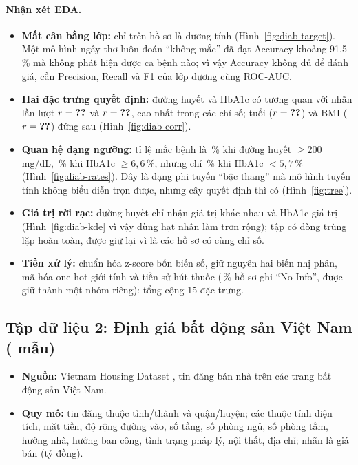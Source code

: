 \paragraph{Nhận xét EDA.}
\begin{itemize}
  \item \textbf{Mất cân bằng lớp:} chỉ  trên  hồ sơ là dương tính
    (Hình~\ref{fig:diab-target}). Một mô hình ngây thơ luôn đoán “không mắc” đã đạt Accuracy khoảng 91,5\,\% mà không phát
    hiện được ca bệnh nào; vì vậy Accuracy không đủ để đánh giá, cần Precision, Recall và F1 của lớp dương cùng ROC-AUC.
  \item \textbf{Hai đặc trưng quyết định:} đường huyết và HbA1c có tương quan với nhãn lần lượt
    $r = \SL{eda/diabetes/corr_glucose}$ và $r = \SL{eda/diabetes/corr_hba1c}$, cao nhất trong các chỉ số; tuổi
    ($r = \SL{eda/diabetes/corr_age}$) và BMI ($r = \SL{eda/diabetes/corr_bmi}$) đứng sau (Hình~\ref{fig:diab-corr}).
  \item \textbf{Quan hệ dạng ngưỡng:} tỉ lệ mắc bệnh là \,\% khi đường huyết
    $\ge 200$\,mg/dL, \,\% khi HbA1c $\ge 6{,}6$\,\%, nhưng chỉ
    \,\% khi HbA1c $< 5{,}7$\,\% (Hình~\ref{fig:diab-rates}). Đây là dạng phi tuyến “bậc
    thang” mà mô hình tuyến tính không biểu diễn trọn được, nhưng cây quyết định thì có (Hình~\ref{fig:tree}).
  \item \textbf{Giá trị rời rạc:} đường huyết chỉ nhận  giá trị khác nhau và HbA1c
     giá trị (Hình~\ref{fig:diab-kde} vì vậy dùng hạt nhân làm trơn rộng); tập có
     dòng trùng lặp hoàn toàn, được giữ lại vì là các hồ sơ có cùng chỉ số.
  \item \textbf{Tiền xử lý:} chuẩn hóa z-score bốn biến số, giữ nguyên hai biến nhị phân, mã hóa one-hot giới tính và tiền
    sử hút thuốc (\,\% hồ sơ ghi “No Info”, được giữ thành một nhóm riêng): tổng cộng
    15 đặc trưng.
\end{itemize}

\subsection{Tập dữ liệu 2: Định giá bất động sản Việt Nam ( mẫu)}

\begin{itemize}
  \item \textbf{Nguồn:} Vietnam Housing Dataset \cite{kaggle_vnhouse}, tin đăng bán nhà trên các trang bất động sản Việt Nam.
  \item \textbf{Quy mô:}  tin đăng thuộc  tỉnh/thành và 
    quận/huyện; các thuộc tính diện tích, mặt tiền, độ rộng đường vào, số tầng, số phòng ngủ, số phòng tắm, hướng nhà,
    hướng ban công, tình trạng pháp lý, nội thất, địa chỉ; nhãn là giá bán (tỷ đồng).
\end{itemize}

